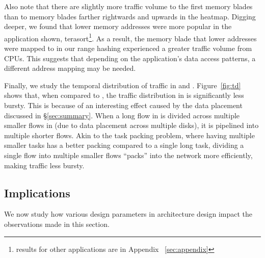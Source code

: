 Also note that there are slightly more traffic volume to the first memory blades than to memory blades farther rightwards and upwards in the heatmap. Digging deeper, we found that lower memory addresses were more popular in the application shown, terasort\footnote{results for other applications are in Appendix ~\ref{sec:appendix}}. As a result, the memory blade that lower addresses were mapped to in our range hashing experienced a greater traffic volume from CPUs. This suggests that depending on the application's data access patterns, a different address mapping may be needed.

Finally, we study the temporal distribution of traffic in \dis and \pdis. Figure~\ref{fig:td} shows that, when compared to \pdis, the traffic distribution in \dis is significantly less bursty. This is because of an interesting effect caused by the data placement discussed in \S\ref{sec:summary}. When a long flow in \pdis is divided across multiple smaller flows in \dis (due to data placement across multiple disks), it is pipelined into multiple shorter flows. Akin to the task packing problem, where having multiple smaller tasks has a better packing compared to a single long task, dividing a single flow into multiple smaller flows ``packs'' into the network more efficiently, making traffic less bursty.

\subsection{Implications}
\label{ssec:knobs}

We now study how various design parameters in \dis architecture design impact the observations made in this section. 



